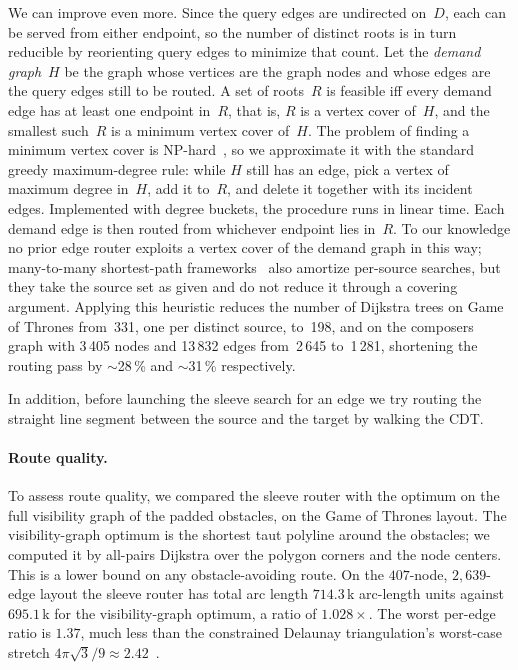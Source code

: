 We can improve even more. Since the query edges are undirected
on~$D$, each can be served from either endpoint, so the number of
distinct roots is in turn reducible by reorienting query edges to
minimize that count. Let the \emph{demand graph}~$H$ be the graph
whose vertices are the graph nodes and whose edges are the query
edges still to be routed. A set of roots~$R$ is feasible iff every
demand edge has at least one endpoint in~$R$, that is, $R$ is a
vertex cover of~$H$, and the smallest such~$R$ is a minimum vertex
cover of~$H$. The problem of finding a minimum vertex cover is
NP-hard~\cite{karp1972reducibility}, so we approximate it
with the standard greedy maximum-degree rule: while $H$ still has an
edge, pick a vertex of maximum degree in~$H$, add it to~$R$, and
delete it together with its incident edges. Implemented with degree
buckets, the procedure runs in linear time. Each demand edge is then
routed from whichever endpoint lies in~$R$. To our knowledge no
prior edge router exploits a vertex cover of the demand graph in
this way; many-to-many shortest-path
frameworks~\cite{knopp2007many} also amortize per-source searches,
but they take the source set as given and do not reduce it through a
covering argument. Applying this heuristic reduces the number of
Dijkstra trees on Game of Thrones from~331, one per distinct source,
to~198, and on the composers graph with 3\,405 nodes and 13\,832
edges from~2\,645 to~1\,281, shortening the routing pass by
$\sim$28\,\% and $\sim$31\,\% respectively.

In addition, before launching the sleeve search for an edge we try routing the
straight line segment between the source and the target by walking the
CDT.

\paragraph{Route quality.}
To assess route quality, we compared the sleeve router with the
optimum on the full visibility graph of the padded obstacles, on the
Game of Thrones layout. The visibility-graph optimum is the shortest
taut polyline around the obstacles; we computed it by all-pairs
Dijkstra over the polygon corners and the node centers. This is a
lower bound on any obstacle-avoiding route. On the $407$-node,
$2{,}639$-edge layout the sleeve router has total arc length
$714.3$\,k arc-length units against $695.1$\,k for the
visibility-graph optimum, a ratio of $1.028\times$. The worst
per-edge ratio is $1.37$, much less than the constrained Delaunay
triangulation's worst-case stretch $4\pi\sqrt{3}/9 \approx
2.42$~\cite{bose2006stretch}.

